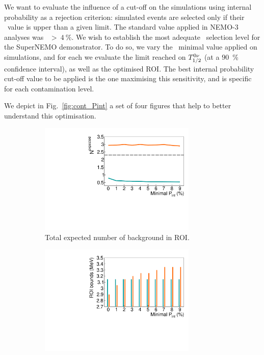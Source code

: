 We want to evaluate the influence of a cut-off on the simulations using internal probability as a rejection criterion: simulated events are selected only if their \Pint\ value is upper than a given limit.
The standard value applied in NEMO-$3$ analyses was \Pint~$>~4~\%$.
We wish to establish the most adequate \Pint\ selection level for the SuperNEMO demonstrator.
To do so, we vary the \Pint\ minimal value applied on simulations, and for each we evaluate the limit reached on $T_{1/2}^{0\nu}$ (at a $90$~\% confidence interval), as well as the optimised ROI.
The best internal probability cut-off value to be applied is the one maximising this sensitivity, and is specific for each contamination level.

We depict in Fig.~\ref{fig:cont_Pint} a set of four figures that help to better understand this optimisation.
\begin{figure}[!h]
\centering
\begin{subfigure}[t]{0.49\textwidth}
  \centering
  \includegraphics[width=0.82\textwidth]{Sensitivity/fig_sensitivity/82Se_cont_cut_nexcl_B.pdf}
  \captionsetup{justification=centering}
  \caption{Total expected number of background in ROI.
    \label{subfig:cont_Pint_Nexp}}
\end{subfigure}
\hfill
\begin{subfigure}[t]{0.49\textwidth}
  \centering
  \includegraphics[width=0.82\textwidth]{Sensitivity/fig_sensitivity/ROI_cut_Pint_B.pdf}

\end{subfigure}
\end{figure}
